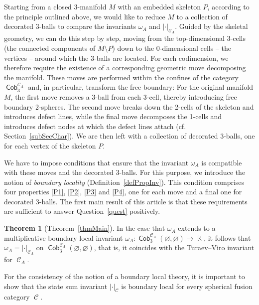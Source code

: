 \documentclass[pdftex]{sigma}
\DeclareMathOperator{\K}{\mathbb{K}}
\DeclareMathOperator{\Cob}{\mathsf{Cob}}
\DeclareMathOperator{\calc}{\mathcal{C}}
\numberwithin{equation}{section}
\theoremstyle{definition}
\newtheorem{Mainthm}{Theorem}
\begin{document}
Starting from a closed 3-manifold $M$ with an embedded skeleton $P$, according to the principle outlined above, we would like to reduce $M$ to a collection of decorated 3-balls to compare the invariants $\omega_A$ and $|\cdot|_{\calc_A}$. Guided by the skeletal geometry, we can do this step by step, moving from the top-dimensional 3-cells (the connected components of $M \setminus P$) down to the 0-dimensional cells -- the vertices -- around which the 3-balls are located. For each codimension, we therefore require the existence of a corresponding geometric move decomposing the manifold. These moves are performed within the confines of the category $\Cob_3^{\calc_A}$ and, in particular, transform the free boundary: For the original manifold $M$, the first move removes a 3-ball from each 3-cell, thereby introducing free boundary 2-spheres. The second move breaks down the 2-cells of the skeleton and introduces defect lines, while the final move decomposes the 1-cells and introduces defect nodes at which the defect lines attach (cf. Section~\ref{subSecChar}). We are then left with a collection of decorated 3-balls, one for each vertex of the skeleton $P$.

We have to impose conditions that ensure that the invariant $\omega_A$ is compatible with these moves and the decorated 3-balls. For this purpose, we introduce the notion of \textit{boundary locality} (Definition~\ref{defPropInv}). This condition comprises four properties \ref{P1}, \ref{P2}, \ref{P3} and \ref{P4}, one for each move and a final one for decorated 3-balls. The first main result of this article is that these requirements are sufficient to answer Question~\ref{quest} positively.

\begin{Mainthm}[{Theorem~\ref{thmMain}}] \label{thmB}
 In the case that $\omega_A$ extends to a multiplicative boundary local invariant $\omega_A\colon \Cob_3^{\calc_A}(\varnothing, \varnothing) \rightarrow \K$, it follows that $\omega_A = |\cdot|_{\calc_A}$ on $\Cob_3^{\calc_A}(\varnothing, \varnothing)$, that is, it coincides with the Turaev--Viro invariant for $\calc_A$.
\end{Mainthm}
For the consistency of the notion of a boundary local theory, it is important to show that the state sum invariant $|\cdot|_{\calc}$ is boundary local for every spherical fusion category $\calc$.
\end{document}
